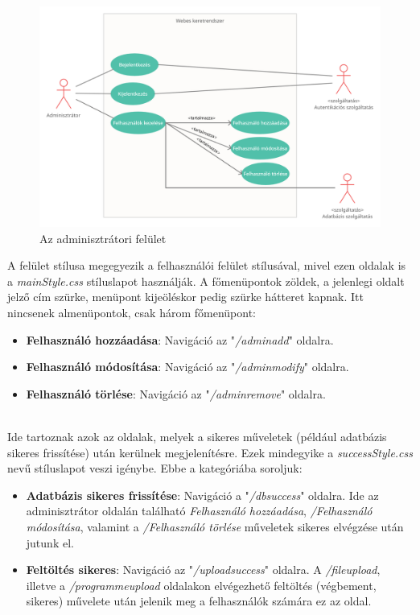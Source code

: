 \begin{figure}[h]
	\centering
		\includegraphics[width=15truecm, height=10truecm]{images/adminisztrator_use_case.png}
	\caption{Az adminisztrátori felület}
	\label{fig:adminusecase}
\end{figure}

\newpage

A felület stílusa megegyezik a felhasználói felület stílusával, mivel ezen oldalak is a \textit{mainStyle.css} stíluslapot használják. A főmenüpontok zöldek, a jelenlegi oldalt jelző cím szürke, menüpont kijeöléskor pedig szürke hátteret kapnak. Itt nincsenek almenüpontok, csak három főmenüpont:

\begin{itemize}
\item{\textbf{Felhasználó hozzáadása}: Navigáció az "\textit{/adminadd}" oldalra.}
\item{\textbf{Felhasználó módosítása}: Navigáció az "\textit{/adminmodify}" oldalra.}
\item{\textbf{Felhasználó törlése}: Navigáció az "\textit{/adminremove}" oldalra.}
\end{itemize}

\\

Ide tartoznak azok az oldalak, melyek a sikeres műveletek (például adatbázis sikeres frissítése) után kerülnek megjelenítésre. Ezek mindegyike a \textit{successStyle.css} nevű stíluslapot veszi igénybe. Ebbe a kategóriába soroljuk:

\begin{itemize}
\item{\textbf{Adatbázis sikeres frissítése}: Navigáció a "\textit{/dbsuccess}" oldalra. Ide az adminisztrátor oldalán található \textit{Felhasználó hozzáadása}, \textit{/Felhasználó módosítása}, valamint a \textit{/Felhasználó törlése} műveletek sikeres elvégzése után jutunk el.}
\item{\textbf{Feltöltés sikeres}: Navigáció az "\textit{/uploadsuccess}" oldalra. A \textit{/fileupload}, illetve a \textit{/programmeupload} oldalakon elvégezhető feltöltés (végbement, sikeres) művelete után jelenik meg a felhasználók számára ez az oldal.}
\end{itemize}


